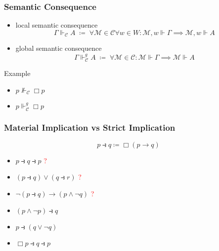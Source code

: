 \documentclass[UTF8,aspectratio=43,11pt,colorlinks,compress,openany]{beamer}%
\begin{document}
\begin{frame}\frametitle{Semantic Consequence}
	\begin{itemize}
		\item local semantic consequence
		\[\Gamma\Vdash_{\mathcal{C}} A\;\coloneqq \;\forall \mathcal{M}\in\mathcal{C}\forall w\in W:\mathcal{M},w\Vdash\Gamma\implies\mathcal{M},w\Vdash A\]
		\item global semantic consequence
		\[\Gamma\Vdash_{\mathcal{C}}^g A\;\coloneqq \;\forall \mathcal{M}\in\mathcal{C}: \mathcal{M}\Vdash\Gamma\implies\mathcal{M}\Vdash A\]
	\end{itemize}
	\begin{block}{Example}
		\begin{itemize}
			\item $p\nVdash_{\mathcal{C}}\Box p$
			\item $p\Vdash_{\mathcal{C}}^g\Box p$
		\end{itemize}
	\end{block}
\end{frame}

\begin{frame}\frametitle{Material Implication vs Strict Implication}
\[p\strictif q \coloneqq  \Box(p\to q)\]
\begin{itemize}
	\item $p\strictif q\strictif p$ \textcolor{red}{?}
	\item $(p\strictif q)\vee(q\strictif r)$ \textcolor{red}{?}
	\item $\neg(p\strictif q)\to(p\wedge\neg q)$ \textcolor{red}{?}
	\item $(p\wedge\neg p)\strictif q$
	\item $p\strictif(q\vee\neg q)$
	\item $\Box p\strictif q\strictif p$
\end{itemize}
\end{frame}
\end{document}
